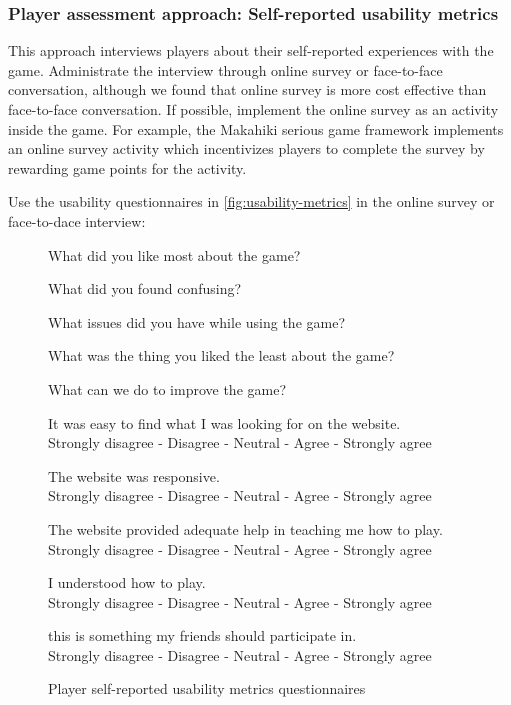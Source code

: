 \documentclass[11pt,oneside]{book}
\begin{document}
\subsubsection{Player assessment approach: Self-reported usability metrics}
\label{Self-reported usability metrics}

This approach interviews players about their self-reported experiences with the game. Administrate the 
interview through online survey or face-to-face conversation, although we found that online survey is more 
cost effective than face-to-face conversation. If possible, implement the online survey as an activity inside the 
game. For example, the Makahiki serious game framework implements an online survey activity which 
incentivizes players to complete the survey by rewarding game points for the activity.

Use the usability questionnaires in \autoref{fig:usability-metrics} in the online survey or face-to-dace interview:\\

\begin{figure}[ht!]
\begin{mybox}
\begin{compactenum}
\item What did you like most about the game?
\item What did you found confusing?
\item What issues did you have while using the game?
\item What was the thing you liked the least about the game?
\item What can we do to improve the game?
\item It was easy to find what I was looking for on the website.  \\
	Strongly disagree  -  Disagree  -  Neutral  -  Agree  -  Strongly agree
\item The website was responsive. \\
	Strongly disagree  -  Disagree  -  Neutral  -  Agree  -  Strongly agree
\item The website provided adequate help in teaching me how to play. \\
	Strongly disagree  -  Disagree  -  Neutral  -  Agree  -  Strongly agree
\item I understood how to play. \\
	Strongly disagree  -  Disagree  -  Neutral  -  Agree  -  Strongly agree
\item this is something my friends should participate in. \\
	Strongly disagree  -  Disagree  -  Neutral  -  Agree  -  Strongly agree
\end{compactenum}
\end{mybox}
\caption{Player self-reported usability metrics questionnaires}
\label{fig:usability-metrics}  
\end{figure}
\end{document}

